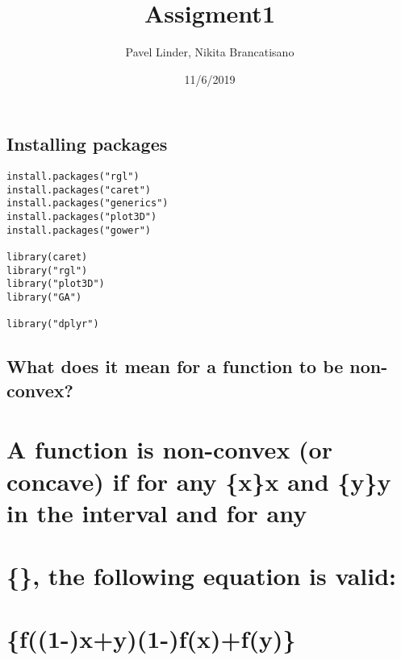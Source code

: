 \documentclass[]{article}
\title{Assigment1}
\author{Pavel Linder, Nikita Brancatisano}
\date{11/6/2019}
\begin{document}
\maketitle

\hypertarget{installing-packages}{%
\subsection{Installing packages}\label{installing-packages}}

\begin{verbatim}
install.packages("rgl")
install.packages("caret")
install.packages("generics")
install.packages("plot3D")
install.packages("gower")

library(caret)
library("rgl")
library("plot3D")
library("GA")

library("dplyr")
\end{verbatim}

\hypertarget{what-does-it-mean-for-a-function-to-be-non-convex}{%
\subsection{What does it mean for a function to be
non-convex?}\label{what-does-it-mean-for-a-function-to-be-non-convex}}

\hypertarget{a-function-is-non-convex-or-concave-if-for-any-xx-and-yy-in-the-interval-and-for-any}{%
\section{\texorpdfstring{A function is non-convex (or concave) if for
any \{\displaystyle x\}x and \{\displaystyle y\}y in the interval and
for
any}{A function is non-convex (or concave) if for any \{x\}x and \{y\}y in the interval and for any}}\label{a-function-is-non-convex-or-concave-if-for-any-xx-and-yy-in-the-interval-and-for-any}}

\hypertarget{the-following-equation-is-valid}{%
\section{\texorpdfstring{\{\displaystyle \alpha \in [0,1]\}\alpha \in [0,1],
the following equation is
valid:}{\{\}, the following equation is valid:}}\label{the-following-equation-is-valid}}

\hypertarget{f1-xy1-fxfy}{%
\section{\texorpdfstring{\{\displaystyle f((1-\alpha )x+\alpha y)\geq (1-\alpha )f(x)+\alpha f(y)\}}{\{f((1-)x+y)(1-)f(x)+f(y)\}}}\label{f1-xy1-fxfy}}
\end{document}
